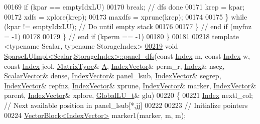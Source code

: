 \begin{DoxyCode}
00169         \textcolor{keywordflow}{if} (kpar == emptyIdxLU) 
00170           \textcolor{keywordflow}{break}; \textcolor{comment}{// dfs done }
00171         krep = kpar; 
00172         xdfs = xplore(krep); 
00173         maxdfs = xprune(krep); 
00174 
00175       \} \textcolor{keywordflow}{while} (kpar != emptyIdxLU); \textcolor{comment}{// Do until empty stack }
00176       
00177     \} \textcolor{comment}{// end if (myfnz = -1)}
00178 
00179   \} \textcolor{comment}{// end if (kperm == -1)   }
00180 \}
00181 
00218 \textcolor{keyword}{template} <\textcolor{keyword}{typename} Scalar, \textcolor{keyword}{typename} StorageIndex>
\hyperlink{group___sparse_l_u___module_acaf62fda387ea03e9caa2734e4e7b0c9}{00219} \textcolor{keywordtype}{void} \hyperlink{group___sparse_l_u___module_acaf62fda387ea03e9caa2734e4e7b0c9}{SparseLUImpl<Scalar,StorageIndex>::panel\_dfs}(\textcolor{keyword}{const} 
      \hyperlink{namespace_eigen_a62e77e0933482dafde8fe197d9a2cfde}{Index} m, \textcolor{keyword}{const} \hyperlink{namespace_eigen_a62e77e0933482dafde8fe197d9a2cfde}{Index} w, \textcolor{keyword}{const} \hyperlink{namespace_eigen_a62e77e0933482dafde8fe197d9a2cfde}{Index} jcol, \hyperlink{group___sparse_core___module_class_eigen_1_1_sparse_matrix}{MatrixType}& \hyperlink{group___core___module_class_eigen_1_1_matrix}{A}, 
      \hyperlink{group___core___module_class_eigen_1_1_matrix}{IndexVector}& perm\_r, \hyperlink{namespace_eigen_a62e77e0933482dafde8fe197d9a2cfde}{Index}& nseg, \hyperlink{group___core___module_class_eigen_1_1_matrix}{ScalarVector}& dense, 
      \hyperlink{group___core___module_class_eigen_1_1_matrix}{IndexVector}& panel\_lsub, \hyperlink{group___core___module_class_eigen_1_1_matrix}{IndexVector}& segrep, \hyperlink{group___core___module_class_eigen_1_1_matrix}{IndexVector}& repfnz, 
      \hyperlink{group___core___module_class_eigen_1_1_matrix}{IndexVector}& xprune, \hyperlink{group___core___module_class_eigen_1_1_matrix}{IndexVector}& marker, \hyperlink{group___core___module_class_eigen_1_1_matrix}{IndexVector}& parent, 
      \hyperlink{group___core___module_class_eigen_1_1_matrix}{IndexVector}& xplore, \hyperlink{struct_eigen_1_1internal_1_1_l_u___global_l_u__t}{GlobalLU\_t}& glu)
00220 \{
00221   \hyperlink{namespace_eigen_a62e77e0933482dafde8fe197d9a2cfde}{Index} nextl\_col; \textcolor{comment}{// Next available position in panel\_lsub[*,jj] }
00222   
00223   \textcolor{comment}{// Initialize pointers }
00224   \hyperlink{group___core___module_class_eigen_1_1_vector_block}{VectorBlock<IndexVector>} marker1(marker, m, m); 

\end{DoxyCode}

